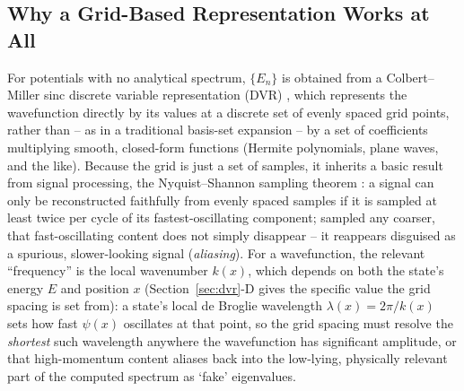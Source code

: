 \documentclass[10pt,conference]{IEEEtran}
\begin{document}
\subsection{Why a Grid-Based Representation Works at All}
For potentials with no analytical spectrum, $\{E_n\}$ is obtained from a Colbert--Miller sinc discrete variable representation (DVR) \cite{colbertmiller1992,lightcarrington2000}, which represents the wavefunction directly by its values at a discrete set of evenly spaced grid points, rather than -- as in a traditional basis-set expansion -- by a set of coefficients multiplying smooth, closed-form functions (Hermite polynomials, plane waves, and the like). Because the grid is just a set of samples, it inherits a basic result from signal processing, the Nyquist--Shannon sampling theorem \cite{oppenheimschafer}: a signal can only be reconstructed faithfully from evenly spaced samples if it is sampled at least twice per cycle of its fastest-oscillating component; sampled any coarser, that fast-oscillating content does not simply disappear -- it reappears disguised as a spurious, slower-looking signal (\emph{aliasing}). For a wavefunction, the relevant ``frequency'' is the local wavenumber $k(x)$, which depends on both the state's energy $E$ and position $x$ (Section~\ref{sec:dvr}-D gives the specific value the grid spacing is set from): a state's local de Broglie wavelength $\lambda(x)=2\pi/k(x)$ sets how fast $\psi(x)$ oscillates at that point, so the grid spacing must resolve the \emph{shortest} such wavelength anywhere the wavefunction has significant amplitude, or that high-momentum content aliases back into the low-lying, physically relevant part of the computed spectrum as `fake' eigenvalues.
\end{document}
